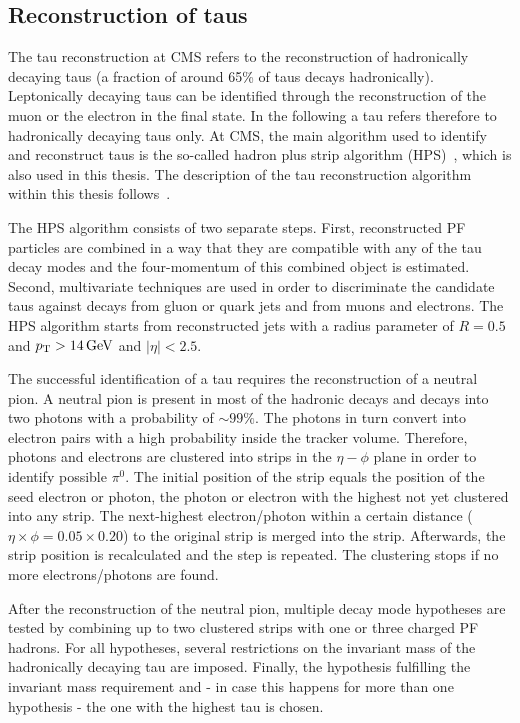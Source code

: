 \subsection{Reconstruction of taus}
\label{subsec:TauReconstruction}
The tau reconstruction at CMS refers to the reconstruction of hadronically decaying taus (a fraction of around 65\% of taus decays hadronically).
Leptonically decaying taus can be identified through the reconstruction of the muon or the electron in the final state.
In the following a tau refers therefore to hadronically decaying taus only.
At CMS, the main algorithm used to identify and reconstruct taus is the so-called hadron plus strip algorithm (HPS)~\cite{bib:CMS:TauReconstruction_8TeV,bib:CMS:TauReconstruction_7TeV}, which is also used in this thesis.
The description of the tau reconstruction algorithm within this thesis follows~\cite{bib:CMS:TauReconstruction_8TeV}.

The HPS algorithm consists of two separate steps. 
First, reconstructed PF particles are combined in a way that they are compatible with any of the tau decay modes and the four-momentum of this combined object is estimated.
Second, multivariate techniques are used in order to discriminate the candidate taus against decays from gluon or quark jets and from muons and electrons. 
The HPS algorithm starts from reconstructed jets with a radius parameter of $R=0.5$ and $p_{\text{T}}>14\,\text{Ge}\kern-0.06667em\text{V}$ and $|\eta|<2.5$.

The successful identification of a tau requires the reconstruction of a neutral pion.
A neutral pion is present in most of the hadronic decays and decays into two photons with a probability of $\sim 99\%$. 
The photons in turn convert into electron pairs with a high probability inside the tracker volume.
Therefore, photons and electrons are clustered into strips in the $\eta-\phi$ plane in order to identify possible $\pi^0$.
The initial position of the strip equals the position of the seed electron or photon, \ie the photon or electron with the highest \pt not yet clustered into any strip.
The next-highest \pt electron/photon within a certain distance ($\eta \times \phi = 0.05 \times 0.20$) to the original strip is merged into the strip.
Afterwards, the strip position is recalculated and the step is repeated.
The clustering stops if no more electrons/photons are found.

After the reconstruction of the neutral pion, multiple decay mode hypotheses are tested by combining up to two clustered strips with one or three charged PF hadrons.
For all hypotheses, several restrictions on the invariant mass of the hadronically decaying tau are imposed.
Finally, the hypothesis fulfilling the invariant mass requirement and - in case this happens for more than one hypothesis - the one with the highest \pt tau is chosen.

